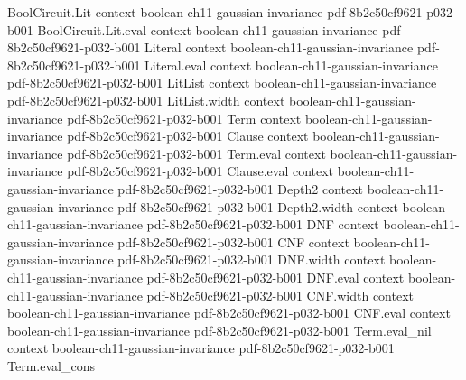 \begin{theorem}
\label{BooleanAnalysis.GaussianSpace.gaussianGenerator_hermite_expansion}
\leanok
{}
\proofstep
  {BoolCircuit.Lit}
  {context}
  {boolean-ch11-gaussian-invariance}
  {pdf-8b2c50cf9621-p032-b001}
\proofstep
  {BoolCircuit.Lit.eval}
  {context}
  {boolean-ch11-gaussian-invariance}
  {pdf-8b2c50cf9621-p032-b001}
\proofstep
  {Literal}
  {context}
  {boolean-ch11-gaussian-invariance}
  {pdf-8b2c50cf9621-p032-b001}
\proofstep
  {Literal.eval}
  {context}
  {boolean-ch11-gaussian-invariance}
  {pdf-8b2c50cf9621-p032-b001}
\proofstep
  {LitList}
  {context}
  {boolean-ch11-gaussian-invariance}
  {pdf-8b2c50cf9621-p032-b001}
\proofstep
  {LitList.width}
  {context}
  {boolean-ch11-gaussian-invariance}
  {pdf-8b2c50cf9621-p032-b001}
\proofstep
  {Term}
  {context}
  {boolean-ch11-gaussian-invariance}
  {pdf-8b2c50cf9621-p032-b001}
\proofstep
  {Clause}
  {context}
  {boolean-ch11-gaussian-invariance}
  {pdf-8b2c50cf9621-p032-b001}
\proofstep
  {Term.eval}
  {context}
  {boolean-ch11-gaussian-invariance}
  {pdf-8b2c50cf9621-p032-b001}
\proofstep
  {Clause.eval}
  {context}
  {boolean-ch11-gaussian-invariance}
  {pdf-8b2c50cf9621-p032-b001}
\proofstep
  {Depth2}
  {context}
  {boolean-ch11-gaussian-invariance}
  {pdf-8b2c50cf9621-p032-b001}
\proofstep
  {Depth2.width}
  {context}
  {boolean-ch11-gaussian-invariance}
  {pdf-8b2c50cf9621-p032-b001}
\proofstep
  {DNF}
  {context}
  {boolean-ch11-gaussian-invariance}
  {pdf-8b2c50cf9621-p032-b001}
\proofstep
  {CNF}
  {context}
  {boolean-ch11-gaussian-invariance}
  {pdf-8b2c50cf9621-p032-b001}
\proofstep
  {DNF.width}
  {context}
  {boolean-ch11-gaussian-invariance}
  {pdf-8b2c50cf9621-p032-b001}
\proofstep
  {DNF.eval}
  {context}
  {boolean-ch11-gaussian-invariance}
  {pdf-8b2c50cf9621-p032-b001}
\proofstep
  {CNF.width}
  {context}
  {boolean-ch11-gaussian-invariance}
  {pdf-8b2c50cf9621-p032-b001}
\proofstep
  {CNF.eval}
  {context}
  {boolean-ch11-gaussian-invariance}
  {pdf-8b2c50cf9621-p032-b001}
\proofstep
  {Term.eval_nil}
  {context}
  {boolean-ch11-gaussian-invariance}
  {pdf-8b2c50cf9621-p032-b001}
\proofstep
  {Term.eval_cons}

\end{theorem}
